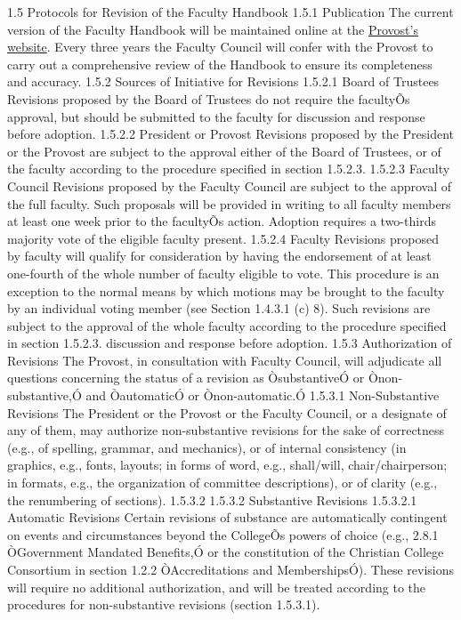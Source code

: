 \documentclass[letterpaper, 11pt]{article}
\begin{document}
1.5 Protocols for Revision of the Faculty Handbook
1.5.1 Publication
   The current version of the Faculty Handbook will be maintained online at the \href{http://www.westmont.edu/_offices/provost/documents/Faculty-Handbook.pdf}{Provost's website}.  Every three years the Faculty Council will confer with the Provost to carry out a comprehensive review of the Handbook to ensure its completeness and accuracy.
1.5.2 Sources of Initiative for Revisions
1.5.2.1 Board of Trustees
Revisions proposed by the Board of Trustees do not require the facultyÕs approval, but should be submitted to the faculty for discussion and response before adoption.
1.5.2.2 President or Provost
Revisions proposed by the President or the Provost are subject to the approval either of the Board of Trustees, or of the faculty according to the procedure specified in section 1.5.2.3.
1.5.2.3 Faculty Council
Revisions proposed by the Faculty Council are subject to the approval of the full faculty. Such proposals will be provided in writing to all faculty members at least one week prior to the facultyÕs action. Adoption requires a two-thirds majority vote of the eligible faculty present.
1.5.2.4 Faculty
Revisions proposed by faculty will qualify for consideration by having the endorsement of at least one-fourth of the whole number of faculty eligible to vote. This procedure is an exception to the normal means by which motions may be brought to the faculty by an individual voting member (see Section 1.4.3.1 (c) 8).  Such revisions are subject to the approval of the whole faculty according to the procedure specified in section 1.5.2.3.
   discussion and response before adoption.
1.5.3 Authorization of Revisions
       The Provost, in consultation with Faculty Council, will adjudicate all questions concerning the status of a revision as ÒsubstantiveÓ or Ònon-substantive,Ó and ÒautomaticÓ or Ònon-automatic.Ó
1.5.3.1 Non-Substantive Revisions
The President or the Provost or the Faculty Council, or a designate of any of them, may authorize non-substantive revisions for the sake of correctness (e.g., of spelling, grammar, and mechanics), or of internal consistency (in graphics, e.g., fonts, layouts; in forms of word, e.g., shall/will, chair/chairperson; in formats, e.g., the organization of committee descriptions), or of clarity (e.g., the renumbering of sections).
1.5.3.2 1.5.3.2 Substantive Revisions
1.5.3.2.1 Automatic Revisions
Certain revisions of substance are automatically contingent on events and circumstances beyond the CollegeÕs powers of choice (e.g., 2.8.1 ÒGovernment Mandated Benefits,Ó or the constitution of the Christian College Consortium in section 1.2.2 ÒAccreditations and MembershipsÓ). These revisions will require no additional authorization, and will be treated according to the procedures for non-substantive revisions (section 1.5.3.1).
\end{document}
